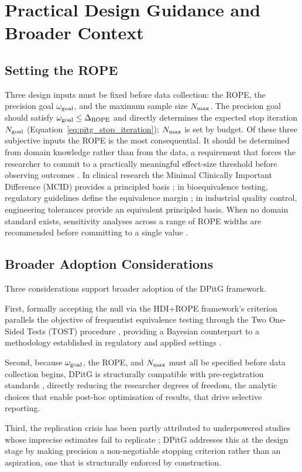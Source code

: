 \section{Practical Design Guidance and Broader Context}\label{app:practical_guidance}

\subsection*{Setting the ROPE}

Three design inputs must be fixed before data collection: the ROPE, the precision goal
$\omega_{\rm goal}$, and the maximum sample size $N_{\rm max}$.
The precision goal should satisfy $\omega_{\rm goal} \leq \Delta_{\rm ROPE}$ and directly
determines the expected stop iteration $N_{\rm goal}$
(Equation~\ref{eq:pitg_stop_iteration}); $N_{\rm max}$ is set by budget.
Of these three subjective inputs the ROPE is the most consequential.
It should be determined from domain knowledge rather than from the data,
a requirement that forces the researcher to commit to a practically meaningful
effect-size threshold before observing outcomes \citep{kruschke2018}.
In clinical research the Minimal Clinically Important Difference (MCID) provides a
principled basis \citep{jaeschke1989}; in bioequivalence testing, regulatory guidelines define the equivalence
margin \citep{schuirmann1987}; in industrial quality
control, engineering tolerances provide an equivalent principled basis.
When no domain standard exists, sensitivity analyses across a range of ROPE widths
are recommended before committing to a single value \citep{lakens2018}.

\subsection*{Broader Adoption Considerations}

Three considerations support broader adoption of the DPitG framework.

First, formally accepting the null via the HDI+ROPE framework's criterion parallels the objective
of frequentist equivalence testing through the Two One-Sided Tests (TOST) procedure
\citep{schuirmann1987, lakens2018}, providing a Bayesian counterpart to a methodology
established in regulatory and applied settings \citep{fda2010bayesian}.

Second, because $\omega_{\rm goal}$, the ROPE, and $N_{\rm max}$ must all be specified
before data collection begins, DPitG is structurally compatible with pre-registration
standards \citep{nosek2018}, directly reducing the researcher degrees of freedom,
the analytic choices that enable post-hoc optimisation of results, that drive
selective reporting.

Third, the replication crisis has been partly attributed to underpowered studies whose
imprecise estimates fail to replicate \citep{osc2015, gelman2014}; DPitG addresses this
at the design stage by making precision a non-negotiable stopping criterion rather than
an aspiration, one that is structurally enforced by construction.
